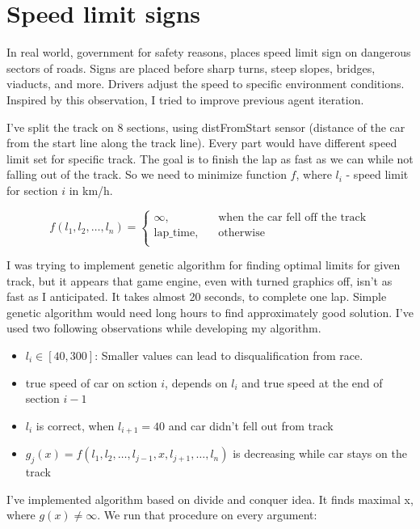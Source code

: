 \documentclass[declaration,shortabstract,english,inz]{iithesis}
\begin{document}
\section{Speed limit signs}

In real world, government for safety reasons, places speed limit sign on dangerous sectors of roads. Signs are placed before sharp turns, steep slopes, bridges, viaducts, and more. Drivers adjust the speed to specific environment conditions. Inspired by this observation, I tried to improve previous agent iteration. 

I've split the track on 8 sections, using distFromStart sensor (distance of the car from the start line along the track line). Every part would have different speed limit set for specific track. The goal is to finish the lap as fast as we can while not falling out of the track. So we need to minimize function $f$, where $l_i$ - speed limit for section $i$ in km/h.

$$ f(l_1, l_2, \dots, l_n ) =  \begin{cases}
    \infty, &\quad \text{when the car fell off the track}\\
    \text{lap\_time}, &\quad \text{otherwise} \\
  \end{cases}
 $$

I was trying to implement genetic algorithm for finding optimal limits for given track, but it appears that game engine, even with turned graphics off, isn't as fast as I anticipated. It takes almost 20 seconds, to complete one lap. Simple genetic algorithm would need long hours to find approximately good solution. I've used two following observations while developing my algorithm.

\begin{itemize}
    \item  $l_i \in [40, 300]$:  Smaller values can lead to disqualification from race.
    \item  true speed of car on sction $i$, depends on $l_i$ and true speed at the end of section $i-1$
    \item
    $l_i$ is correct, when $l_{i+1} = 40$ and car didn't fell out from track
    \item  $g_j(x) = f(l_1,l_2, \dots,l_{j-1}, x, l_{j+1}, \dots, l_n)$ is decreasing while car stays on the track
    
\end{itemize}


I've implemented algorithm based on divide and conquer idea. It finds maximal x, where $g(x) \neq \infty$. We run that procedure on every argument:
\end{document}
